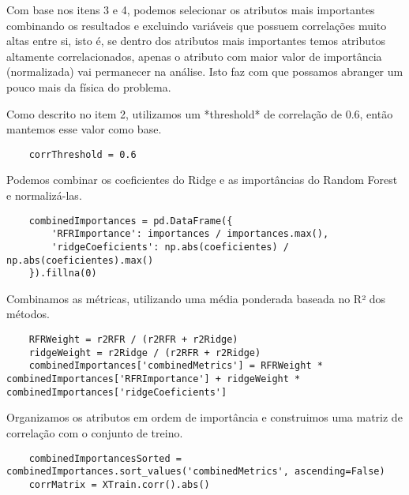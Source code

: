 Com base nos itens 3 e 4, podemos selecionar os atributos mais importantes combinando os resultados e excluindo variáveis que possuem correlações muito altas entre si, isto é, se dentro dos atributos mais importantes temos atributos altamente correlacionados, apenas o atributo com maior valor de importância (normalizada) vai permanecer na análise. Isto faz com que possamos abranger um pouco mais da física do problema.

Como descrito no item 2, utilizamos um *threshold* de correlação de 0.6, então mantemos esse valor como base.
\begin{longlisting}
    \begin{verbatim}
    corrThreshold = 0.6
    \end{verbatim}
\end{longlisting}

Podemos combinar os coeficientes do Ridge e as importâncias do Random Forest e normalizá-las.
\begin{longlisting}
    \begin{verbatim}
    combinedImportances = pd.DataFrame({
        'RFRImportance': importances / importances.max(),
        'ridgeCoeficients': np.abs(coeficientes) / np.abs(coeficientes).max()
    }).fillna(0)
    \end{verbatim}
\end{longlisting}

Combinamos as métricas, utilizando uma média ponderada baseada no R² dos métodos.
\begin{longlisting}
    \begin{verbatim}
    RFRWeight = r2RFR / (r2RFR + r2Ridge)
    ridgeWeight = r2Ridge / (r2RFR + r2Ridge)
    combinedImportances['combinedMetrics'] = RFRWeight * combinedImportances['RFRImportance'] + ridgeWeight * combinedImportances['ridgeCoeficients']
    \end{verbatim}
\end{longlisting}

Organizamos os atributos em ordem de importância e construimos uma matriz de correlação com o conjunto de treino.
\begin{longlisting}
    \begin{verbatim}
    combinedImportancesSorted = combinedImportances.sort_values('combinedMetrics', ascending=False)
    corrMatrix = XTrain.corr().abs()
    \end{verbatim}
\end{longlisting}

